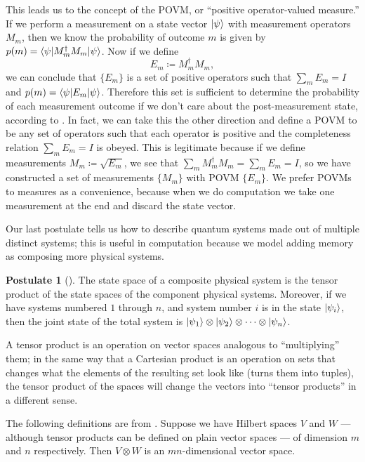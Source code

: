 \documentclass[12pt,twoside]{reedthesis}
\theoremstyle{plain}   %
\theoremstyle{definition}
\newtheorem{post}{Postulate}[section]
\theoremstyle{remark}
\numberwithin{equation}{section}
\begin{document}
  This leads us to the concept of the POVM, or ``positive operator-valued measure.''
  If we perform a measurement on a state vector $\ket{\psi}$ with measurement operators $M_m$, then we know the probability of outcome $m$ is given by $p(m) = \braket{\psi | M_m^\dag M_m | \psi}$.
  Now if we define
  \[ E_m \coloneq M_m^\dag M_m,\]
  we can conclude that $\{E_m\}$ is a set of positive operators such that $\sum_m E_m = I$ and $p(m) = \braket{\psi | E_m | \psi}$.
  Therefore this set is sufficient to determine the probability of each measurement outcome if we don't care about the post-measurement state, according to \cite[2.2.6]{nielsen2010}.
  In fact, we can take this the other direction and define a POVM to be any set of operators such that each operator is positive and the
  completeness relation $\sum_m E_m = I$ is obeyed.
  This is legitimate because if we define measurements $M_m \coloneq \sqrt{E_m}$, we see that $\sum_m M_m^\dag M_m = \sum_m E_m = I$,
  so we have constructed a set of measurements $\{M_m\}$ with POVM $\{E_m\}$.
  We prefer POVMs to measures as a convenience, because when we do computation we take one measurement at the end and discard the state vector. \par
  Our last postulate tells us how to describe quantum systems made out of multiple distinct systems; this is useful in computation because we model adding memory as
  composing more physical systems.
  \begin{post}[{\cite[2.2.8]{nielsen2010}}] 
    The state space of a composite physical system is the tensor product of the state spaces of the component physical systems. Moreover,
    if we have systems numbered $1$ through $n$, and system number $i$ is in the state $\ket{\psi_i }$, then the joint state of the total system is $\ket{\psi_1} \otimes \ket{\psi_2} \otimes \cdots \otimes \ket{\psi_n}$.
  \end{post}
  A tensor product is an operation on vector spaces analogous to ``multiplying'' them;
  in the same way that a Cartesian product is an operation on sets that changes what the elements of the resulting set look like (turns them into tuples),
  the tensor product of the spaces will change the vectors into ``tensor products'' in a different sense.
  \par
  The following definitions are from \cite[2.1.7]{nielsen2010}.
  Suppose we have Hilbert spaces $V$ and $W$ --- although tensor products can be defined on plain vector spaces --- of dimension $m$ and $n$ respectively.
  Then $V \otimes W$ is an $mn$-dimensional vector space.
\end{document}
